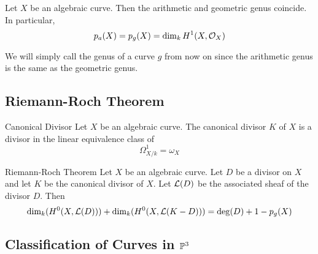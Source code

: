 \documentclass[a4paper]{article}
\begin{document}
\begin{prp}{}{} Let $X$ be an algebraic curve. Then the arithmetic and geometric genus coincide. In particular, $$p_a(X)=p_g(X)=\dim_kH^1(X,\mathcal{O}_X)$$
\end{prp}

We will simply call the genus of a curve $g$ from now on since the arithmetic genus is the same as the geometric genus. 

\subsection{Riemann-Roch Theorem}
\begin{defn}{Canonical Divisor}{} Let $X$ be an algebraic curve. The canonical divisor $K$ of $X$ is a divisor in the linear equivalence class of $$\Omega_{X/k}^1=\omega_X$$
\end{defn}

\begin{thm}{Riemann-Roch Theorem}{} Let $X$ be an algebraic curve. Let $D$ be a divisor on $X$ and let $K$ be the canonical divisor of $X$. Let $\mathcal{L}(D)$ be the associated sheaf of the divisor $D$. Then $$\dim_k(H^0(X,\mathcal{L}(D)))+\dim_k(H^0(X,\mathcal{L}(K-D)))=\deg(D)+1-p_g(X)$$
\end{thm}

\subsection{Classification of Curves in $\mathbb{P}^3$}
\end{document}
